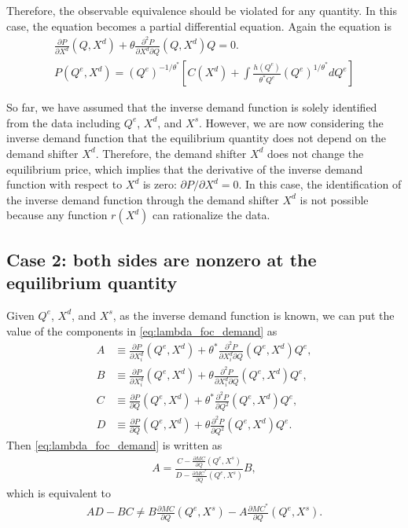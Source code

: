 \documentclass[11pt, a4paper]{article}
\theoremstyle{remark}
\begin{document}
Therefore, the observable equivalence should be violated for any quantity.
In this case, the equation becomes a partial differential equation.
Again the equation is 
\begin{align}
    \frac{\partial P}{\partial X^{d}}(Q, X^{d}) + \theta\frac{\partial^2 P}{\partial X^{d}\partial Q}(Q, X^{d})Q = 0.\\
    P(Q^e, X^d) = (Q^e)^{-1/\theta^*}[C(X^d) + \int \frac{h(Q^e)}{\theta^*Q^e}(Q^e)^{1/\theta^*}dQ^e]
\end{align}



So far, we have assumed that the inverse demand function is solely identified from the data including $Q^e$, $X^{d}$, and $X^{s}$.
However, we are now considering the inverse demand function that the equilibrium quantity does not depend on the demand shifter $X^{d}$.
Therefore, the demand shifter $X^{d}$ does not change the equilibrium price, which implies that the derivative of the inverse demand function with respect to $X^{d}$ is zero: $\partial P/\partial X^{d} = 0$.
In this case, the identification of the inverse demand function through the demand shifter $X^{d}$ is not possible because any function $r(X^{d})$ can rationalize the data.






\subsection{Case 2: both sides are nonzero at the equilibrium quantity}
Given $Q^e$, $X^{d}$, and $X^{s}$, as the inverse demand function is known, we can put the value of the components in \eqref{eq:lambda_foc_demand} as
\begin{align}
    A & \equiv \frac{\partial P}{\partial X^{d}_i}(Q^e, X^{d}) + \theta^{*}\frac{\partial^2 P}{\partial X^{d}_{i}\partial Q}(Q^e, X^{d})Q^e,\\
    B & \equiv \frac{\partial P}{\partial X^{d}_i}(Q^e, X^{d}) + \theta\frac{\partial^2 P}{\partial X^{d}_{i}\partial Q}(Q^e, X^{d})Q^e,\\
    C & \equiv \frac{\partial P}{\partial Q}(Q^e, X^{d}) + \theta^{*}\frac{\partial^2 P}{\partial Q^2}(Q^e, X^{d})Q^e,\\
    D & \equiv \frac{\partial P}{\partial Q}(Q^e, X^{d}) + \theta\frac{\partial^2 P}{\partial Q^2}(Q^e, X^{d})Q^e.
\end{align}
Then \eqref{eq:lambda_foc_demand} is written as
\begin{align}
    A = \frac{C - \frac{\partial MC}{\partial Q}(Q^e, X^{s})}{D- \frac{\partial MC^{*}}{\partial Q}(Q^e, X^{s})}B,
\end{align}
which is equivalent to
\begin{align}
    AD - BC \ne B\frac{\partial MC}{\partial Q}(Q^e, X^{s}) - A \frac{\partial MC^{*}}{\partial Q}(Q^e, X^{s}).
\end{align}
\end{document}
